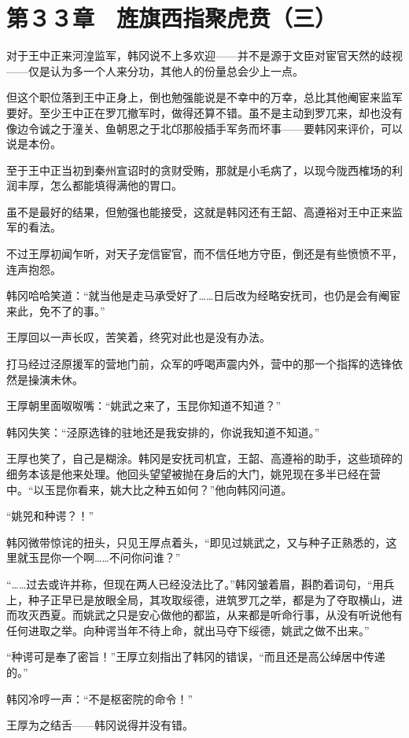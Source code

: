 \section{第３３章　旌旗西指聚虎贲（三）}

对于王中正来河湟监军，韩冈说不上多欢迎——并不是源于文臣对宦官天然的歧视——仅是认为多一个人来分功，其他人的份量总会少上一点。

但这个职位落到王中正身上，倒也勉强能说是不幸中的万幸，总比其他阉宦来监军要好。至少王中正在罗兀撤军时，做得还算不错。虽不是主动到罗兀来，却也没有像边令诚之于潼关、鱼朝恩之于北邙那般插手军务而坏事——要韩冈来评价，可以说是本份。

至于王中正当初到秦州宣诏时的贪财受贿，那就是小毛病了，以现今陇西榷场的利润丰厚，怎么都能填得满他的胃口。

虽不是最好的结果，但勉强也能接受，这就是韩冈还有王韶、高遵裕对王中正来监军的看法。

不过王厚初闻乍听，对天子宠信宦官，而不信任地方守臣，倒还是有些愤愤不平，连声抱怨。

韩冈哈哈笑道：“就当他是走马承受好了……日后改为经略安抚司，也仍是会有阉宦来此，免不了的事。”

王厚回以一声长叹，苦笑着，终究对此也是没有办法。

打马经过泾原援军的营地门前，众军的呼喝声震内外，营中的那一个指挥的选锋依然是操演未休。

王厚朝里面呶呶嘴：“姚武之来了，玉昆你知道不知道？”

韩冈失笑：“泾原选锋的驻地还是我安排的，你说我知道不知道。”

王厚也笑了，自己是糊涂。韩冈是安抚司机宜，王韶、高遵裕的助手，这些琐碎的细务本该是他来处理。他回头望望被抛在身后的大门，姚兕现在多半已经在营中。“以玉昆你看来，姚大比之种五如何？”他向韩冈问道。

“姚兕和种谔？！”

韩冈微带惊诧的扭头，只见王厚点着头，“即见过姚武之，又与种子正熟悉的，这里就玉昆你一个啊……不问你问谁？”

“……过去或许并称，但现在两人已经没法比了。”韩冈皱着眉，斟酌着词句，“用兵上，种子正早已是放眼全局，其攻取绥德，进筑罗兀之举，都是为了夺取横山，进而攻灭西夏。而姚武之只是安心做他的都监，从来都是听命行事，从没有听说他有任何进取之举。向种谔当年不待上命，就出马夺下绥德，姚武之做不出来。”

“种谔可是奉了密旨！”王厚立刻指出了韩冈的错误，“而且还是高公绰居中传递的。”

韩冈冷哼一声：“不是枢密院的命令！”

王厚为之结舌——韩冈说得并没有错。

